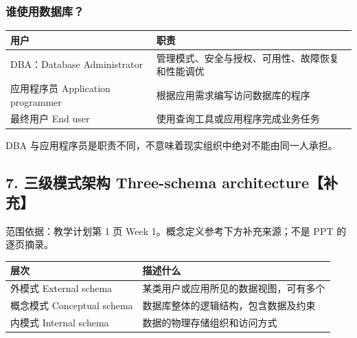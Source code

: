 \subsubsection{谁使用数据库？}\label{01_database_fundamentals_zh-ux8c01ux4f7fux7528ux6570ux636eux5e93}

\begin{longtable}[]{@{}
  >{\raggedright\arraybackslash}p{}
  >{\raggedright\arraybackslash}p{}@{}}
\toprule\noalign{}
\begin{minipage}[b]{\linewidth}\raggedright
用户
\end{minipage} & \begin{minipage}[b]{\linewidth}\raggedright
职责
\end{minipage} \\
\midrule\noalign{}
\endhead
\bottomrule\noalign{}
\endlastfoot
DBA：Database Administrator & 管理模式、安全与授权、可用性、故障恢复和性能调优 \\
应用程序员 Application programmer & 根据应用需求编写访问数据库的程序 \\
最终用户 End user & 使用查询工具或应用程序完成业务任务 \\
\end{longtable}

DBA 与应用程序员是职责不同，不意味着现实组织中绝对不能由同一人承担。

\Needspace{11cm}
\subsection{7. 三级模式架构 Three-schema architecture【补充】}\label{01_database_fundamentals_zh-ux4e09ux7ea7ux6a21ux5f0fux67b6ux6784-three-schema-architectureux8865ux5145}


范围依据：教学计划第 1 页 Week 1。概念定义参考下方补充来源；不是 PPT 的逐页摘录。

\begin{longtable}[]{@{}ll@{}}
\toprule\noalign{}
层次 & 描述什么 \\
\midrule\noalign{}
\endhead
\bottomrule\noalign{}
\endlastfoot
外模式 External schema & 某类用户或应用所见的数据视图，可有多个 \\
概念模式 Conceptual schema & 数据库整体的逻辑结构，包含数据及约束 \\
内模式 Internal schema & 数据的物理存储组织和访问方式 \\
\end{longtable}

